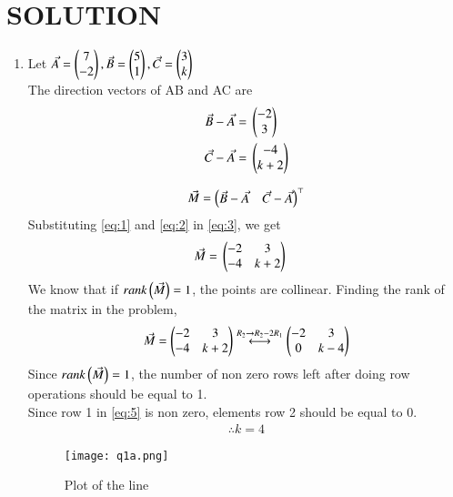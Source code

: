 \documentclass[journal,12pt,twocolumn]{IEEEtran}
\begin{document}
\section*{SOLUTION}
\begin{enumerate}
\item Let $\Vec{A}=\begin{pmatrix}7\\-2\end{pmatrix}, \Vec{B}=\begin{pmatrix}5 \\ 1\end{pmatrix}, \Vec{C}=\begin{pmatrix}3 \\ k\end{pmatrix}$\\
The direction vectors of AB and AC are
\begin{align}
\label{eq:1}
\Vec{B} - \Vec{A} ={}& \begin{pmatrix}-2 \\ 3\end{pmatrix}\\
\label{eq:2}
\Vec{C} - \Vec{A} ={}& \begin{pmatrix}-4 \\ k+2\end{pmatrix}
\end{align}

\begin{align}
\label{eq:3}
\Vec{M} =\begin{pmatrix}\Vec{B}-\Vec{A} & \Vec{C}-\Vec{A}\end{pmatrix}^\top
\end{align}
Substituting \eqref{eq:1} and \eqref{eq:2} in \eqref{eq:3}, we get
\begin{align}
\label{eq:4}
\Vec{M}={}&\begin{pmatrix}-2 & 3 \\ -4 & k+2\end{pmatrix}
\end{align}
We know that if $rank\left(\Vec{M}\right)=1$, the points are collinear.
Finding the rank of the matrix in the problem,
\begin{align}
\label{eq:5}
\Vec{M} = \begin{pmatrix}-2 & 3 \\ -4 & k+2\end{pmatrix} \overset{R_{2}\rightarrow R_{2}-2R_{1}}{\longleftrightarrow} \begin{pmatrix}-2 & 3 \\ 0 & k-4\end{pmatrix}
\end{align}
Since $rank\left(\Vec{M}\right)=1$, the number of non zero rows left after doing row operations should be equal to 1.\\
Since row 1 in \eqref{eq:5} is non zero, elements row 2 should be equal to 0.
\begin{align}
\therefore k=4
\end{align}
\begin{figure}[!h]
\centering
\texttt{[image: q1a.png]}
\caption{Plot of the line}
\end{figure}




\end{enumerate}
\end{document}
